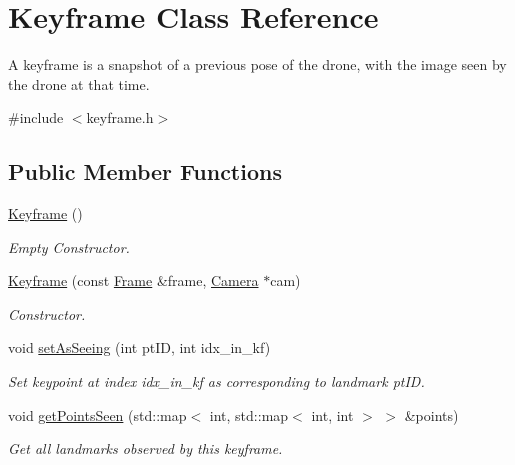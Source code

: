 \hypertarget{classKeyframe}{}\section{Keyframe Class Reference}
\label{classKeyframe}


A keyframe is a snapshot of a previous pose of the drone, with the image seen by the drone at that time.  




{\ttfamily \#include $<$keyframe.\+h$>$}

\subsection*{Public Member Functions}
\begin{DoxyCompactItemize}
\item 
\mbox{\label{classKeyframe_ac9546775756767dc481259b8bea2fc9b}} 
\hyperlink{classKeyframe_ac9546775756767dc481259b8bea2fc9b}{Keyframe} ()
\begin{DoxyCompactList}\small\item\em Empty Constructor. \end{DoxyCompactList}\item 
\hyperlink{classKeyframe_a4bfb8c03eac34ee1e8d7e0d6820ebb67}{Keyframe} (const \hyperlink{structFrame}{Frame} \&frame, \hyperlink{structCamera}{Camera} $\ast$cam)
\begin{DoxyCompactList}\small\item\em Constructor. \end{DoxyCompactList}\item 
\mbox{\label{classKeyframe_a84369da5f39b656942799baefd31f1c9}} 
void \hyperlink{classKeyframe_a84369da5f39b656942799baefd31f1c9}{set\+As\+Seeing} (int pt\+ID, int idx\+\_\+in\+\_\+kf)
\begin{DoxyCompactList}\small\item\em Set keypoint at index idx\+\_\+in\+\_\+kf as corresponding to landmark pt\+ID. \end{DoxyCompactList}\item 
void \hyperlink{classKeyframe_ae71b9b8511a96059dca267764d832f84}{get\+Points\+Seen} (std\+::map$<$ int, std\+::map$<$ int, int $>$ $>$ \&points)
\begin{DoxyCompactList}\small\item\em Get all landmarks observed by this keyframe. \end{DoxyCompactList}\item 

\end{DoxyCompactItemize}
